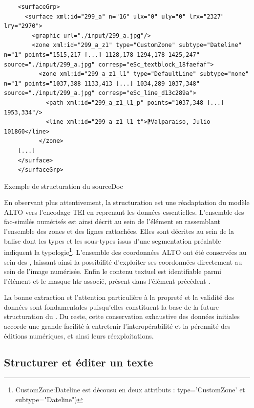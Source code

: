 	\begin{listing}
	\begin{verbatim}
	<surfaceGrp>
      <surface xml:id="299_a" n="16" ulx="0" uly="0" lrx="2327" lry="2970">
        <graphic url="./input/299_a.jpg"/>
        <zone xml:id="299_a_z1" type="CustomZone" subtype="Dateline" n="1" points="1515,217 [...] 1128,178 1294,178 1425,247" source="./input/299_a.jpg" corresp="eSc_textblock_18faefaf">
          <zone xml:id="299_a_z1_l1" type="DefaultLine" subtype="none" n="1" points="1037,388 1133,413 [...] 1034,289 1037,348" source="./input/299_a.jpg" corresp="eSc_line_d13c289a">
            <path xml:id="299_a_z1_l1_p" points="1037,348 [...] 1953,334"/>
            <line xml:id="299_a_z1_l1_t">⁋Valparaiso, Julio 101860</line>
          </zone>
    [...]
    </surface>
    </surfaceGrp>
	\end{verbatim}
	\caption{Exemple de structuration du sourceDoc}
	\label{code:sourcedoc}
	\end{listing}
	
	En observant plus attentivement, la structuration est une réadaptation du modèle ALTO vers l'encodage TEI en reprenant les données essentielles. L'ensemble des fac-similés numérisés est ainsi décrit au sein de l'élément  en rassemblant l'ensemble des zones et des lignes rattachées. Elles sont décrites au sein de la balise  dont les types et les sous-types issus d'une segmentation préalable indiquent la typologie\footnote{CustomZone:Dateline est décousu en deux attributs : type='CustomZone' et subtype="Dateline")}. L'ensemble des coordonnées ALTO ont été conservées au sein des , laissant ainsi la possibilité d'exploiter ses coordonnées directement au sein de l'image numérisée. Enfin le contenu textuel est identifiable parmi l'élément  et le masque \gls{htr} associé, présent dans l'élément précédent .
	
	La bonne extraction et l'attention particulière à la propreté et la validité des données sont fondamentales puisqu'elles constituent la base de la future structuration du . Du reste, cette conservation exhaustive des données initiales accorde une grande facilité à entretenir l'interopérabilité et la pérennité des éditions numériques, et ainsi leurs réexploitations.
	
	\subsection{Structurer et éditer un texte}
	
